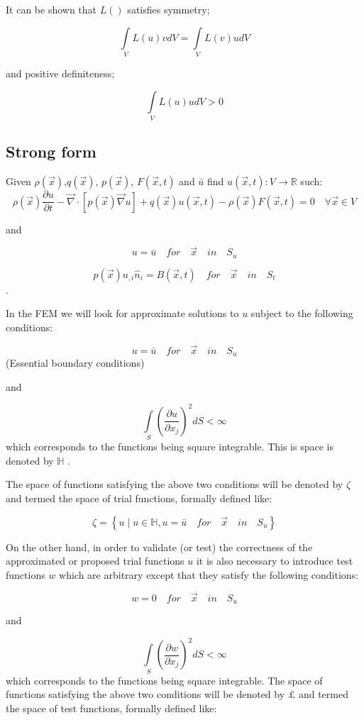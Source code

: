 It can be shown that $L()$ satisfies symmetry;

\[\int\limits_V {L(u)vdV = } \int\limits_V {L(v)u} dV\]

and positive definiteness;

\[\int\limits_V {L(u)udV}  > 0\]

\subsection*{Strong form}
Given $\rho (\vec x)$,$q(\vec x)$, $p(\vec x)$, $F(\vec x,t)$ and $\bar u$ find $u(\vec x , t):V \to \mathbb{R}$ such:
\[
\rho (\vec x)\frac{{\partial u}}{{\partial t}} - \vec \nabla  \cdot \left[ {p(\vec x)\vec \nabla u} \right] + q(\vec x)u(\vec x,t) - \rho (\vec x)F(\vec x,t) = 0
 \quad \forall \vec x \in V \]
 


and

\[u = \bar u \quad for \quad {\vec x} \quad in \quad S_u\]

\[p(\vec x){u_{,i}}{{\hat n}_i} = B(\vec x,t) \quad for \quad {\vec x} \quad in \quad S_t\].

In the FEM we will look for approximate solutions to $u$ subject to the following conditions:

\[u = \bar u \quad for \quad {\vec x} \quad in \quad S_u\] (Essential boundary conditions)

and

\[{\int\limits_S {\left( {\frac{{\partial u}}{{\partial {x_j}}}} \right)} ^2}dS < \infty \] which corresponds to the functions being square integrable. This is space is denoted by $\mathbb{H}$ .

The space of functions satisfying the above two conditions will be denoted by $\zeta $ and termed the space of trial functions, formally defined like:

\[\zeta  = \left\{ {u \mid u \in \mathbb{H},u = \bar u \quad for \quad \vec x \quad in \quad S_u} \right\}\]

On the other hand, in order to validate (or test) the correctness of the approximated or proposed trial functions $u$ it is also necessary to introduce test functions $w$ which are arbitrary except that they satisfy the following conditions:

\[w = 0 \quad for \quad {\vec x} \quad in \quad S_u\] 

and

\[{\int\limits_S {\left( {\frac{{\partial w}}{{\partial {x_j}}}} \right)} ^2}dS < \infty \] which corresponds to the functions being square integrable. The space of functions satisfying the above two conditions will be denoted by $\pounds$ and termed the space of test functions, formally defined like:

